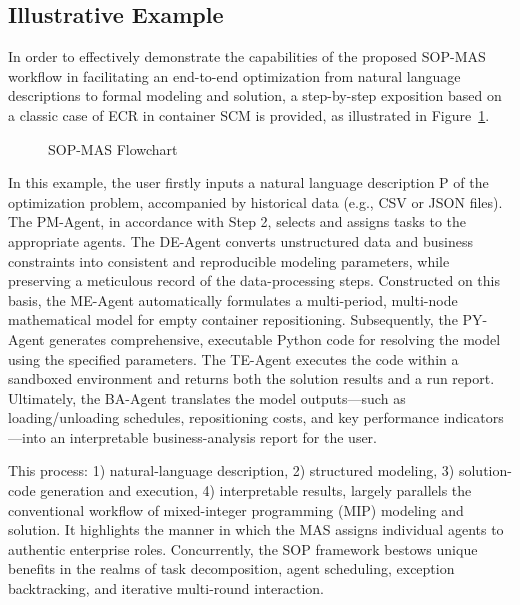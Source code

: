 \documentclass[preprint,12pt]{elsarticle}
\begin{document}
\subsection{Illustrative Example}

In order to effectively demonstrate the capabilities of the proposed SOP-MAS workflow in facilitating an end-to-end optimization from natural language descriptions to formal modeling and solution, a step-by-step exposition based on a classic case of ECR in container SCM is provided, as illustrated in Figure~\ref{fig2}.

\begin{figure}[t]%
\centering%
\caption{SOP-MAS Flowchart}\label{fig2}
\end{figure}

In this example, the user firstly inputs a natural language description P of the optimization problem, accompanied by historical data (e.g., CSV or JSON files). The PM-Agent, in accordance with Step 2, selects and assigns tasks to the appropriate agents. The DE-Agent converts unstructured data and business constraints into consistent and reproducible modeling parameters, while preserving a meticulous record of the data-processing steps. Constructed on this basis, the ME-Agent automatically formulates a multi-period, multi-node mathematical model for empty container repositioning. Subsequently, the PY-Agent generates comprehensive, executable Python code for resolving the model using the specified parameters. The TE-Agent executes the code within a sandboxed environment and returns both the solution results and a run report. Ultimately, the BA-Agent translates the model outputs—such as loading/unloading schedules, repositioning costs, and key performance indicators—into an interpretable business-analysis report for the user.

This process: 1) natural-language description, 2) structured modeling, 3) solution-code generation and execution, 4) interpretable results, largely parallels the conventional workflow of mixed-integer programming (MIP) modeling and solution. It highlights the manner in which the MAS assigns individual agents to authentic enterprise roles. Concurrently, the SOP framework bestows unique benefits in the realms of task decomposition, agent scheduling, exception backtracking, and iterative multi-round interaction.
\end{document}
